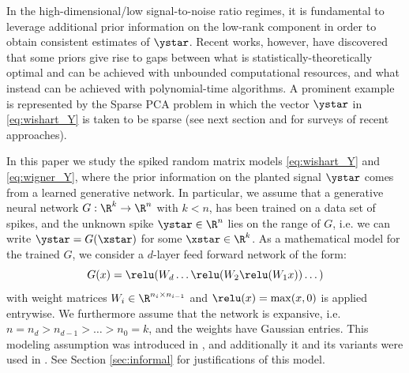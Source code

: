 In the high-dimensional/low signal-to-noise ratio 
regimes, it is fundamental to leverage additional prior information on the low-rank component in order to obtain consistent estimates of $\ystar$. 
Recent works, however,  have discovered that some priors give rise to gaps between what is statistically-theoretically optimal and can be achieved with unbounded computational resources, and what instead can be achieved with polynomial-time algorithms. A prominent example is represented by 
the Sparse PCA problem in which the vector $\ystar$ in \eqref{eq:wishart_Y} is taken to be sparse (see next section and \cite{bandeira2018notes,kunisky2019notes} for surveys of recent approaches).  

In this paper we study the spiked random matrix models  \eqref{eq:wishart_Y} and \eqref{eq:wigner_Y}, where 
the prior information on the planted signal $\ystar$ 
comes from a learned generative network. 
In particular, we assume that a generative neural network $G: \R^k \to \R^n$ with $k < n$, has been trained on a data set of spikes, and the unknown spike $\ystar \in \R^n$ lies on the range of $G$, i.e. we can write $\ystar = G(\xstar)$ for some $\xstar \in \R^k$.
As a mathematical model for the trained $G$, we consider  
a $d$-layer feed forward network of the form:
\begin{equation}\label{eq:Gx}
G(x) = \relu(W_d \dots \relu(W_2 \relu(W_1 x)) \dots)
\end{equation}
with weight matrices $W_i \in \R^{n_i \times n_{i-1}}$ and $\relu(x) = \max(x,0)$  is applied entrywise. We furthermore assume that the network is expansive, i.e. $n = n_d > n_{d-1} > \dots > n_0 = k$, and the weights have Gaussian entries. This  modeling assumption was introduced in \cite{HV17}, and additionally it and its variants were used in \cite{HHHV18,oscar2018phase,ma2018invertibility,hand2019global,song2019surfing}. See  Section \ref{sec:informal} for justifications of this model. 

